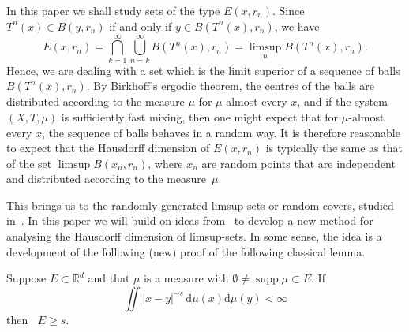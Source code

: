 \documentclass[AHL,Unicode,longabstracts]{cedram}
\DeclareMathOperator{\dimh}{dim_H}
\DeclareMathOperator{\supp}{supp}
\newcommand*{\dimh}{\mathrm{dim}_{\mathrm{H}}}
\newcommand*{\dd}{\mathrm{d}}
\begin{document}
In this paper we shall study sets of the type $E (x,r_n)$. Since $T^n (x) \in B(y,r_n)$ if and only if $y \in B(T^n(x),r_n)$, we have
\[
E(x,r_n) = \bigcap_{k=1}^\infty \bigcup_{n=k}^\infty B(T^n(x),r_n) =
\limsup_n B(T^n(x),r_n).
\]
Hence, we are dealing with a set which is the limit superior of a sequence of balls $B(T^n(x),r_n)$. By Birkhoff's ergodic theorem, the centres of the balls are distributed according to the measure $\mu$ for $\mu$-almost every $x$, and if the system $(X,T,\mu)$ is sufficiently fast mixing, then one might expect that for $\mu$-almost every $x$, the sequence of balls behaves in a random way. It is therefore reasonable to expect that the Hausdorff dimension of $E(x,r_n)$ is typically the same as that of the set $\limsup B(x_n,r_n)$, where $x_n$ are random points that are independent and distributed according to the measure~$\mu$.

This brings us to the randomly generated limsup-sets or random covers, studied in~\cite{fanwu,durand,jarvenpaaetal,persson,fengetal,seuret,ekstrompersson}. In this paper we will build on ideas from~\cite{persson} to develop a new method for analysing the Hausdorff dimension of limsup-sets. In some sense, the idea is a development of the following (new) proof of the following classical lemma.

\begin{lemm}\label{lem:classical}
Suppose $E \subset \mathbb{R}^d$ and that $\mu$ is a measure with $\emptyset \neq \supp \mu \subset E$. If
\[
\iint |x-y|^{-s} \, \dd\mu (x) \dd \mu (y) < \infty
\]
then $\dimh E \geq s$.
\end{lemm}
\end{document}
